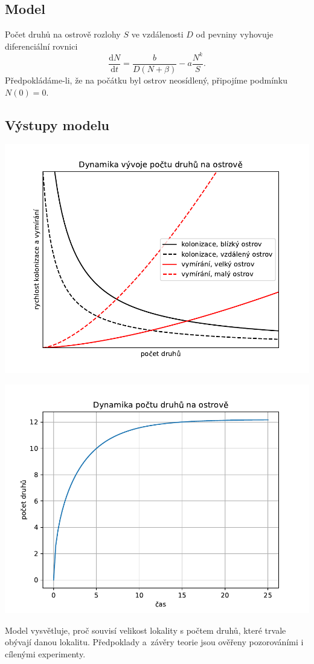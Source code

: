 \documentclass[handouts]{beamer}
\begin{document}
\begin{frame}
\bigskip
\subsection{Model}

Počet druhů na ostrově rozlohy $S$ ve
vzdálenosti $D$ od pevniny vyhovuje diferenciální rovnici
$$
  \frac{\mathrm dN}{\mathrm dt}= \frac b{D(N+\beta)}-a\frac {N^k}S.
$$
Předpokládáme-li, že na počátku byl ostrov neosídlený, připojíme
podmínku $N(0)=0$.

\subsection{Výstupy modelu}


\begin{minipage}[t]{0.5\linewidth}
  \includegraphics[width=\linewidth]{ostrov1.pdf}
\end{minipage}\begin{minipage}[t]{0.5\linewidth}
  \includegraphics[width=\linewidth]{ostrov2.pdf}
\end{minipage}

Model vysvětluje, proč souvisí velikost 
lokality s počtem druhů, které trvale obývají danou lokalitu.
Předpoklady a~závěry teorie jsou ověřeny 
pozorováními i cílenými experimenty.

\end{frame}
\end{document}
